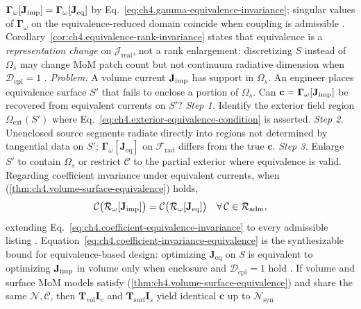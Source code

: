\(\boldsymbol{\Gamma}_\omega[\mathbf{J}_{\mathrm{imp}}]=\boldsymbol{\Gamma}_\omega[\mathbf{J}_{\mathrm{eq}}]\) by
Eq.~\eqref{eq:ch4.gamma-equivalence-invariance}; singular values of \(\boldsymbol{\Gamma}_\omega\) on the
equivalence-reduced domain coincide when coupling is admissible \cite{harrington2001}.
Corollary~\ref{cor:ch4.equivalence-rank-invariance} states that equivalence is a \emph{representation change} on
\(\mathcal{J}_{\mathrm{real}}\), not a rank enlargement: discretizing \(S\) instead of \(\Omega_{s}\) may change MoM
patch count but not continuum radiative dimension when \(\mathcal{D}_{\mathrm{cpl}}=1\) \cite{harrington2001}.
\emph{Problem.} A volume current \(\mathbf{J}_{\mathrm{imp}}\) has support in \(\Omega_{s}\). An engineer places equivalence surface
\(S'\) that fails to enclose a portion of \(\Omega_{s}\). Can \(\mathbf{c}=\boldsymbol{\Gamma}_\omega[\mathbf{J}_{\mathrm{imp}}]\) be
recovered from equivalent currents on \(S'\)?
\emph{Step 1.} Identify the exterior field region \(\Omega_{\mathrm{ext}}(S')\) where
Eq.~\eqref{eq:ch4.exterior-equivalence-condition} is asserted.
\emph{Step 2.} Unenclosed source segments radiate directly into regions not determined by tangential data on \(S'\);
\(\boldsymbol{\Gamma}_\omega[\mathbf{J}_{\mathrm{eq}}]\) on \(\mathcal{F}_{\mathrm{rad}}\) differs from the true
\(\mathbf{c}\).
\emph{Step 3.} Enlarge \(S'\) to contain \(\Omega_{s}\) or restrict \(\mathcal{C}\) to the partial exterior where
equivalence is valid.
Regarding coefficient invariance under equivalent currents, when (\ref{thm:ch4.volume-surface-equivalence}) holds,
\begin{equation}
\label{eq:ch4.coefficient-invariance-equivalence}
\mathcal{C}\big(\mathcal{R}_\omega[\mathbf{J}_{\mathrm{imp}}]\big)
=
\mathcal{C}\big(\mathcal{R}_\omega[\mathbf{J}_{\mathrm{eq}}]\big)
\quad\forall\,\mathcal{C}\in\mathcal{R}_{\mathrm{adm}},
\end{equation}
extending Eq.~\eqref{eq:ch4.coefficient-equivalence-invariance} to every admissible listing
. Equation~\eqref{eq:ch4.coefficient-invariance-equivalence} is the
synthesizable bound for equivalence-based design: optimizing \(\mathbf{J}_{\mathrm{eq}}\) on \(S\) is equivalent to
optimizing \(\mathbf{J}_{\mathrm{imp}}\) in volume only when enclosure and \(\mathcal{D}_{\mathrm{cpl}}=1\) hold .
\label{cor:ch4.mom-equivalence-consistency}
If volume and surface MoM models satisfy (\ref{thm:ch4.volume-surface-equivalence}) and share the same
\(\mathcal{N},\mathcal{C}\), then \(\mathbf{T}_{\mathrm{vol}}\mathbf{I}_{v}\) and
\(\mathbf{T}_{\mathrm{surf}}\mathbf{I}_{s}\) yield identical \(\mathbf{c}\) up to \(\mathcal{N}_{\mathrm{syn}}\)
